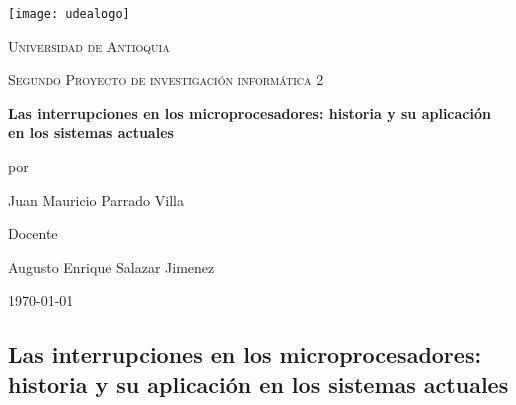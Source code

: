 \documentclass[12pt,a4paper]{report}
\begin{document}
   

    \begin{titlepage}

               \centering


               \texttt{[image: udealogo]}\par\vspace{1cm}

               {\scshape\LARGE Universidad de Antioquia \par}

               \vspace{1cm}

               {\scshape\large Segundo Proyecto de investigación informática 2\par}

               \vspace{1.5cm}

               {\Large\bfseries Las interrupciones en los microprocesadores: historia y su aplicación en los sistemas actuales\par}

               \vspace{2cm}

               por\par

               {\Large Juan Mauricio Parrado Villa\par}


               \vspace{2cm}

               Docente\par

               {\Large Augusto Enrique Salazar Jimenez}


               \vfill


               {\large \today\par}

    \end{titlepage}

    \large

    \begin{center}

        \section*{Las interrupciones en los microprocesadores: historia y su aplicación en los sistemas actuales}

    \end{center}
        
\end{document}
